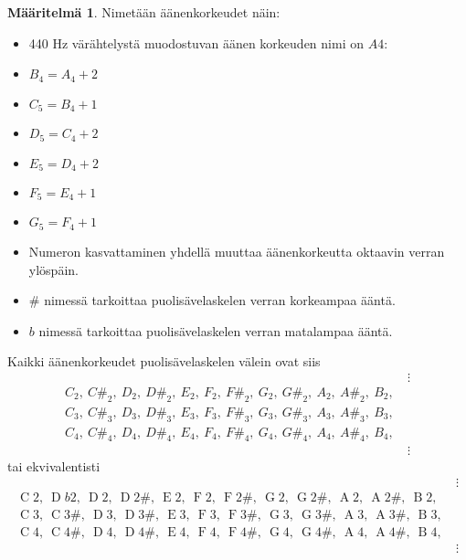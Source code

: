\documentclass[12pt]{article}
\theoremstyle{plain}
\theoremstyle{definition}
\newtheorem{definition}[theorem]{M\"a\"aritelm\"a}
\newcommand{\A}{\operatorname{A}}
\newcommand{\B}{\operatorname{B}}
\newcommand{\C}{\operatorname{C}}
\newcommand{\D}{\operatorname{D}}
\newcommand{\E}{\operatorname{E}}
\newcommand{\F}{\operatorname{F}}
\newcommand{\G}{\operatorname{G}}
\newcounter{audiocounter}
\newcommand{\audio}[1]{
    \stepcounter{audiocounter}
    
}
\begin{document}
\begin{definition}
Nimetään äänenkorkeudet näin:
\begin{itemize}
\item 440 Hz värähtelystä muodostuvan äänen korkeuden nimi on $A4$: \audio{A4}
\item $B_4 = A_4 + 2$
\item $C_5 = B_4 + 1$
\item $D_5 = C_4 + 2$
\item $E_5 = D_4 + 2$
\item $F_5 = E_4 + 1$
\item $G_5 = F_4 + 1$
\item Numeron kasvattaminen yhdellä muuttaa äänenkorkeutta oktaavin verran ylöspäin.
\item $\#$ nimessä tarkoittaa puolisävelaskelen verran korkeampaa ääntä.
\item $b$ nimessä tarkoittaa puolisävelaskelen verran matalampaa ääntä.
\end{itemize}
\end{definition}
Kaikki äänenkorkeudet puolisävelaskelen välein ovat siis
\begin{align*}
&\vdots \\
C_2,~C\#_2,~D_2,~D\#_2,~E_2,~F_2,~F\#_2,~G_2,~G\#_2,~A_2,~A\#_2,~B_2,~\\
C_3,~C\#_3,~D_3,~D\#_3,~E_3,~F_3,~F\#_3,~G_3,~G\#_3,~A_3,~A\#_3,~B_3,~\\
C_4,~C\#_4,~D_4,~D\#_4,~E_4,~F_4,~F\#_4,~G_4,~G\#_4,~A_4,~A\#_4,~B_4,~\\
&\vdots
\end{align*}
tai ekvivalentisti
\begin{align*}
&\vdots \\
\C2,~\D b2,~\D2,~\D2\#,~\E2,~\F2,~\F2\#,~\G2,~\G2\#,~\A2,~\A2\#,~\B2,~\\
\C3,~\C3\#,~\D3,~\D3\#,~\E3,~\F3,~\F3\#,~\G3,~\G3\#,~\A3,~\A3\#,~\B3,~\\
\C4,~\C4\#,~\D4,~\D4\#,~\E4,~\F4,~\F4\#,~\G4,~\G4\#,~\A4,~\A4\#,~\B4,~\\
&\vdots
\end{align*}
\end{document}
